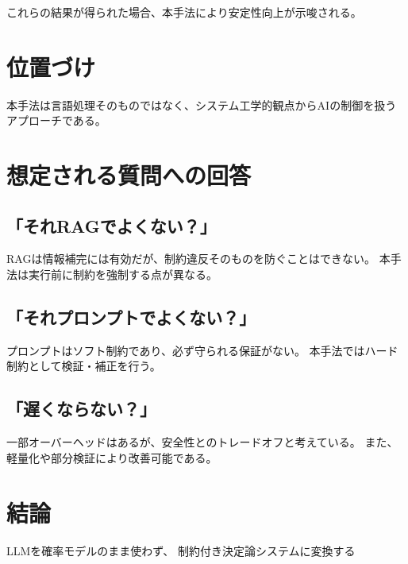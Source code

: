 \documentclass{article}
\begin{document}
これらの結果が得られた場合、本手法により安定性向上が示唆される。

\section{位置づけ}

本手法は言語処理そのものではなく、システム工学的観点からAIの制御を扱うアプローチである。

\section{想定される質問への回答}

\subsection{「それRAGでよくない？」}

RAGは情報補完には有効だが、制約違反そのものを防ぐことはできない。  
本手法は実行前に制約を強制する点が異なる。

\subsection{「それプロンプトでよくない？」}

プロンプトはソフト制約であり、必ず守られる保証がない。  
本手法ではハード制約として検証・補正を行う。

\subsection{「遅くならない？」}

一部オーバーヘッドはあるが、安全性とのトレードオフと考えている。  
また、軽量化や部分検証により改善可能である。

\section{結論}
LLMを確率モデルのまま使わず、
制約付き決定論システムに変換する
\end{document}
